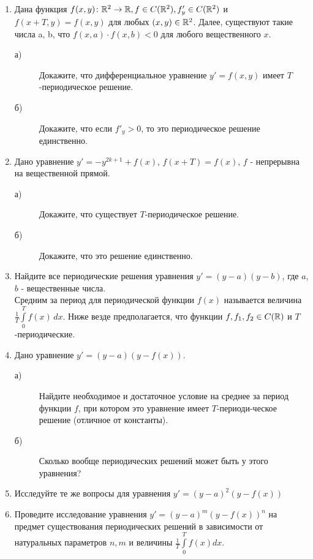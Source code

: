 \begin{enumerate}
\item Дана функция $f(x,y)\colon\mathbb{R}^2 \rightarrow \mathbb{R}, f \in C(\mathbb{R}^2), f'_y \in C(\mathbb{R}^2)$ и $f(x+T,y)=f(x,y)$ для любых $(x,y) \in \mathbb{R}^2$. Далее, существуют такие числа a, b, что $f(x,a)\cdot f(x,b)<0$ для любого вещественного $x$. \vspace{0.4cm}

    \begin{description}
    \item [а) ]Докажите, что дифференциальное уравнение $y'=f(x,y)$ имеет $T$-периодическое решение.
    \item [б) ]Докажите, что если ${f'}_y>0$, то это периодическое решение единственно.
    \end{description}
\item Дано уравнение $y'=-y^{2k+1}+f(x)$, $f(x+T)=f(x)$, $f$ - непрерывна на вещественной прямой.
\begin{description}
    \item [а) ]Докажите, что существует $T$-периодическое решение.
    \item [б) ]Докажите, что это решение единственно.
    \end{description}
\item Найдите все периодические решения уравнения $y'=(y-a)(y-b)$, где $a$, $b$ - вещественные числа.\\
Средним за период для периодической функции $f(x)$ называется величина ${\frac{1}{T}} \int\limits_0^T f(x)\, dx$. Ниже везде предполагается, что функции $f, f_1, f_2 \in C(\mathbb{R})$ и $T$-периодические.
\item Дано уравнение $y'=(y-a)(y-f(x))$.
\begin{description}
    \item [а) ]Найдите необходимое и достаточное условие на среднее за период функции $f$, при котором это уравнение имеет $T$-периоди-\linebreak ческое решение (отличное от константы).
    \item [б) ]Сколько вообще периодических решений может быть у этого уравнения?
    \end{description}
\item Исследуйте те же вопросы для уравнения $y'=(y-a)^2(y-f(x))$
\item Проведите исследование уравнения $y'=(y-a)^m(y-f(x))^n$ на предмет существования периодических решений в зависимости от натуральных параметров $n, m$ и величины ${\frac{1}{T}} \int\limits_0^T f(x) dx$.
\end{enumerate}